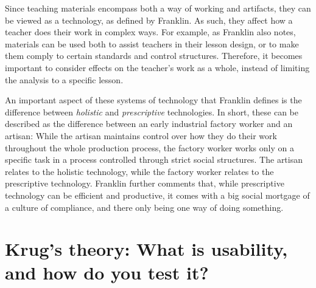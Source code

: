 Since teaching materials encompass both a way of working and artifacts, they can be viewed as a technology, as defined by Franklin. As such, they affect how a teacher does their work in complex ways. For example, as Franklin also notes, materials can be used both to assist teachers in their lesson design, or to make them comply to certain standards and control structures. Therefore, it becomes important to consider effects on the teacher's work as a whole, instead of limiting the analysis to a specific lesson.

An important aspect of these systems of technology that Franklin defines is the difference between \textit{holistic} and \textit{prescriptive} technologies. In short, these can be described as the difference between an early industrial factory worker and an artisan: While the artisan maintains control over how they do their work throughout the whole production process, the factory worker works only on a specific task in a process controlled through strict social structures. The artisan relates to the holistic technology, while the factory worker relates to the prescriptive technology. Franklin further comments that, while prescriptive technology can be efficient and productive, it comes with a big social mortgage of a culture of compliance, and there only being one way of doing something.

\section{Krug's theory: What is usability, and how do you test it?}

